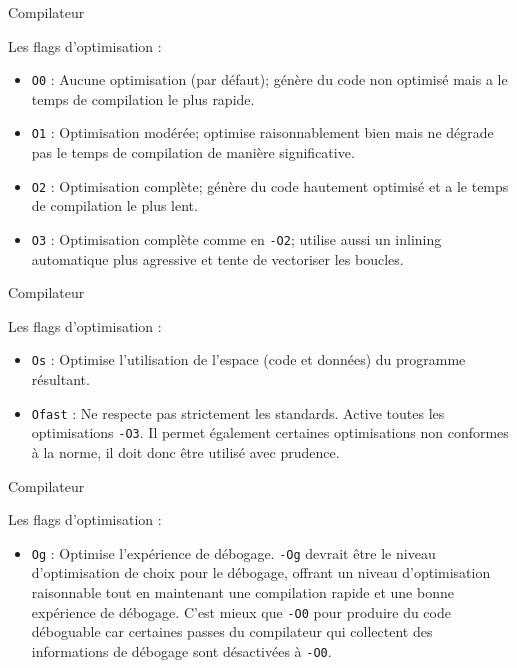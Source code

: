 \begin{frame}{Compilateur}
	\begin{block}{Les flags d'optimisation :}
		\begin{itemize}
			\item \texttt{O0} : Aucune optimisation (par défaut); génère du code non optimisé mais a le temps de compilation le plus rapide.
			\item \texttt{O1} : Optimisation modérée; optimise raisonnablement bien mais ne dégrade pas le temps de compilation de manière significative.
			\item \texttt{O2} : Optimisation complète; génère du code hautement optimisé et a le temps de compilation le plus lent.
			\item \texttt{O3} : Optimisation complète comme en \texttt{-O2}; utilise aussi un \alert{inlining} automatique plus agressive et tente de vectoriser les boucles.
		\end{itemize}
	\end{block}
\end{frame}

\begin{frame}{Compilateur}
	\begin{block}{Les flags d'optimisation :}
		\begin{itemize}
			\item \texttt{Os} : Optimise l'utilisation de l'espace (code et données) du programme résultant.
			\item \texttt{Ofast} : Ne respecte pas strictement les standards. Active toutes les optimisations \texttt{-O3}. Il permet également certaines optimisations non conformes à la norme, il doit donc être utilisé avec prudence.
		\end{itemize}
	\end{block}
\end{frame}

\begin{frame}{Compilateur}
	\begin{block}{Les flags d'optimisation :}
		\begin{itemize}
			\item \texttt{Og} : Optimise l'expérience de débogage. \texttt{-Og} devrait être le niveau d'optimisation de choix pour le débogage, offrant un niveau d'optimisation raisonnable tout en maintenant une compilation rapide et une bonne expérience de débogage. C'est mieux que \texttt{-O0} pour produire du code déboguable car certaines passes du compilateur qui collectent des informations de débogage sont désactivées à \texttt{-O0}.
		\end{itemize}
	\end{block}
\end{frame}

